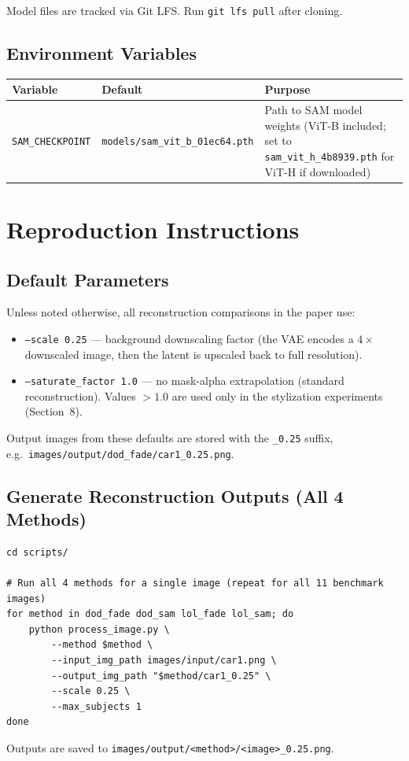 \documentclass[11pt,a4paper]{article}
\begin{document}
Model files are tracked via Git LFS. Run \texttt{git lfs pull} after cloning.

\subsection{Environment Variables}

\begin{table}[h]
\centering
\small
\begin{tabularx}{\textwidth}{llX}
\toprule
\textbf{Variable} & \textbf{Default} & \textbf{Purpose} \\
\midrule
\texttt{SAM\_CHECKPOINT} & \texttt{models/sam\_vit\_b\_01ec64.pth} & Path to SAM model weights (ViT-B included; set to \texttt{sam\_vit\_h\_4b8939.pth} for ViT-H if downloaded) \\
\bottomrule
\end{tabularx}
\end{table}

\section{Reproduction Instructions}

\subsection{Default Parameters}

Unless noted otherwise, all reconstruction comparisons in the paper use:
\begin{itemize}
  \item \texttt{--scale 0.25} --- background downscaling factor (the VAE encodes a $4\times$ downscaled image, then the latent is upscaled back to full resolution).
  \item \texttt{--saturate\_factor 1.0} --- no mask-alpha extrapolation (standard reconstruction). Values $> 1.0$ are used only in the stylization experiments (Section~8).
\end{itemize}
Output images from these defaults are stored with the \texttt{\_0.25} suffix, e.g.\ \texttt{images/output/dod\_fade/car1\_0.25.png}.

\subsection{Generate Reconstruction Outputs (All 4 Methods)}

\begin{lstlisting}[style=bash]
cd scripts/

# Run all 4 methods for a single image (repeat for all 11 benchmark images)
for method in dod_fade dod_sam lol_fade lol_sam; do
    python process_image.py \
        --method $method \
        --input_img_path images/input/car1.png \
        --output_img_path "$method/car1_0.25" \
        --scale 0.25 \
        --max_subjects 1
done
\end{lstlisting}
Outputs are saved to \texttt{images/output/<method>/<image>\_0.25.png}.
\end{document}

